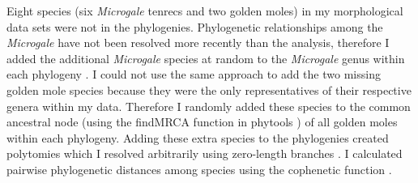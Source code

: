 	Eight species (six \textit{Microgale} tenrecs and two golden moles) in my morphological data sets were not in the phylogenies. Phylogenetic relationships among the \textit{Microgale} have not been resolved more recently than the \citep{Kuhn2011} analysis, therefore I added the additional \textit{Microgale} species at random to the \textit{Microgale} genus within each phylogeny \citep{Revell2012}. I could not use the same approach to add the two missing golden mole species because they were the only representatives of their respective genera within my data. Therefore I randomly added these species to the common ancestral node (using the findMRCA function in phytools \citep{Revell2012}) of all golden moles within each phylogeny. Adding these extra species to the phylogenies created polytomies which I resolved arbitrarily using zero-length branches \citep{Paradis2004}. I calculated pairwise phylogenetic distances among species using the cophenetic function \citep{Team2014}. 





